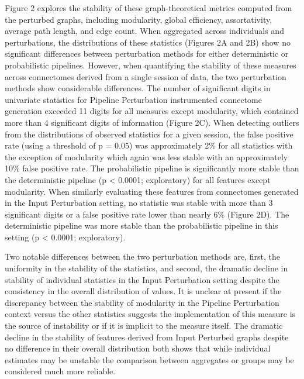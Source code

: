\documentclass[fleqn,10pt]{SelfArx} %
\begin{document}
Figure 2 explores the stability of these graph-theoretical metrics computed from the perturbed graphs, including
modularity, global efficiency, assortativity, average path length, and edge count. When aggregated across individuals
and perturbations, the distributions of these statistics (Figures 2A and 2B) show no significant differences between
perturbation methods for either deterministic or probabilistic pipelines. However, when quantifying the stability of
these measures across connectomes derived from a single session of data, the two perturbation methods show considerable
differences. The number of significant digits in univariate statistics for Pipeline Perturbation instrumented
connectome generation exceeded 11 digits for all measures except modularity, which contained more than 4 significant
digits of information (Figure 2C). When detecting outliers from the distributions of observed statistics for a given
session, the false positive rate (using a threshold of p = 0.05) was approximately 2\% for all statistics with the
exception of modularity which again was less stable with an approximately 10\% false positive rate. The probabilistic
pipeline is significantly more stable than the deterministic pipeline (p < 0.0001; exploratory) for all features
except modularity. When similarly evaluating these features from connectomes generated in the Input Perturbation
setting, no statistic was stable with more than 3 significant digits or a false positive rate lower than nearly 6\%
(Figure 2D). The deterministic pipeline was more stable than the probabilistic pipeline in this setting (p < 0.0001;
exploratory).

Two notable differences between the two perturbation methods are, first, the uniformity in the stability of the
statistics, and second, the dramatic decline in stability of individual statistics in the Input Perturbation setting
despite the consistency in the overall distribution of values. It is unclear at present if the discrepancy between the
stability of modularity in the Pipeline Perturbation context versus the other statistics suggests the implementation of
this measure is the source of instability or if it is implicit to the measure itself. The dramatic decline in the
stability of features derived from Input Perturbed graphs despite no difference in their overall distribution both
shows that while individual estimates may be unstable the comparison between aggregates or groups may be considered
much more reliable.
\end{document}

